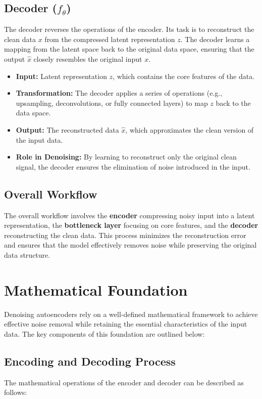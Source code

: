 \documentclass[a4paper,12pt]{article}
\begin{document}
\subsection{Decoder ($f_\theta$)}
The decoder reverses the operations of the encoder. Its task is to reconstruct the clean data $x$ from the compressed latent representation $z$. The decoder learns a mapping from the latent space back to the original data space, ensuring that the output $\hat{x}$ closely resembles the original input $x$.

\begin{itemize}
    \item \textbf{Input:} Latent representation $z$, which contains the core features of the data.
    \item \textbf{Transformation:} The decoder applies a series of operations (e.g., upsampling, deconvolutions, or fully connected layers) to map $z$ back to the data space.
    \item \textbf{Output:} The reconstructed data $\hat{x}$, which approximates the clean version of the input data.
    \item \textbf{Role in Denoising:} By learning to reconstruct only the original clean signal, the decoder ensures the elimination of noise introduced in the input.
\end{itemize}

\subsection{Overall Workflow}
The overall workflow involves the \textbf{encoder} compressing noisy input into a latent representation, the \textbf{bottleneck layer} focusing on core features, and the \textbf{decoder} reconstructing the clean data. This process minimizes the reconstruction error and ensures that the model effectively removes noise while preserving the original data structure.

\section{Mathematical Foundation}

Denoising autoencoders rely on a well-defined mathematical framework to achieve effective noise removal while retaining the essential characteristics of the input data. The key components of this foundation are outlined below:
\subsection{Encoding and Decoding Process}
The mathematical operations of the encoder and decoder can be described as follows:
\end{document}
